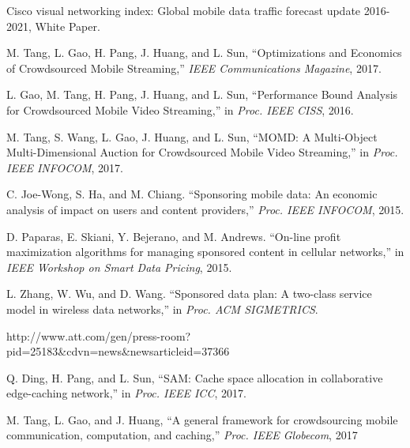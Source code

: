 
\begin{thebibliography}{99}

\scriptsize




 Cisco visual networking index: Global mobile data traffic forecast update 2016-2021, White Paper.

M. Tang, L. Gao, H. Pang, J. Huang, and L. Sun, ``Optimizations and Economics of Crowdsourced Mobile Streaming,'' \emph{IEEE Communications Magazine},  2017.


L. Gao, M. Tang, H. Pang, J. Huang, and L. Sun, ``Performance Bound Analysis for Crowdsourced Mobile Video Streaming,''
in \emph{Proc. IEEE CISS}, 2016.

M. Tang, S. Wang, L. Gao, J. Huang, and L. Sun, ``MOMD: A Multi-Object Multi-Dimensional Auction for Crowdsourced Mobile Video Streaming,''
in \emph{Proc. IEEE INFOCOM}, 2017.



C. Joe-Wong, S. Ha, and M. Chiang. ``Sponsoring mobile data: An economic analysis of impact on users and content providers,''   \emph{Proc. IEEE INFOCOM}, 2015.

D. Paparas, E. Skiani, Y. Bejerano, and M. Andrews. ``On-line profit maximization algorithms for managing sponsored content in cellular networks,'' in \emph{IEEE Workshop on Smart Data Pricing}, 2015.

L. Zhang, W. Wu, and D. Wang. ``Sponsored data plan: A two-class service model in wireless data networks,'' in \emph{Proc. ACM SIGMETRICS}.

http://www.att.com/gen/press-room?pid=25183\&cdvn=news\&newsarticleid=37366


Q. Ding, H. Pang, and L. Sun, ``SAM: Cache space allocation in collaborative edge-caching network,'' in \emph{Proc. IEEE ICC}, 2017.

M. Tang, L. Gao, and J. Huang, ``A general framework for crowdsourcing mobile communication, computation, and caching,''
 \emph{Proc. IEEE Globecom}, 2017


\end{thebibliography}
